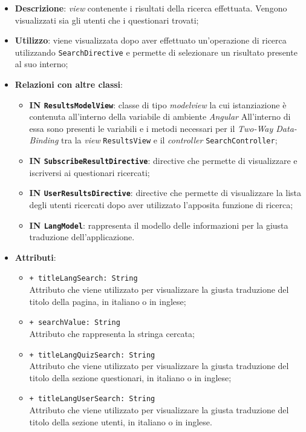 \begin{itemize}
	\item \textbf{Descrizione}: \textit{view} contenente i risultati della ricerca effettuata. Vengono visualizzati sia gli utenti che i questionari trovati;
	\item \textbf{Utilizzo}: viene visualizzata dopo aver effettuato un'operazione di ricerca utilizzando \texttt{SearchDirective} e permette di selezionare un risultato presente al suo interno; 
	\item \textbf{Relazioni con altre classi}:
	\begin{itemize}
		\item \textbf{IN \texttt{ResultsModelView}}: classe di tipo \textit{modelview} la cui istanziazione è contenuta all'interno della variabile di ambiente \textit{Angular} All'interno di essa sono presenti le variabili e i metodi necessari per il \textit{Two-Way Data-Binding} tra la \textit{view} \texttt{ResultsView} e il \textit{controller} \texttt{SearchController};
		\item \textbf{IN \texttt{SubscribeResultDirective}}: directive che permette di visualizzare e iscriversi ai questionari ricercati;
		\item \textbf{IN \texttt{UserResultsDirective}}: directive che permette di visualizzare la lista degli utenti ricercati dopo aver utilizzato l'apposita funzione di ricerca;
		\item \textbf{IN \texttt{LangModel}}: rappresenta il modello delle informazioni per la giusta traduzione dell'applicazione.
	\end{itemize}
	\item \textbf{Attributi}:
		\begin{itemize}
			\item \texttt{+ titleLangSearch: String} \\ Attributo che viene utilizzato per visualizzare la giusta traduzione del titolo della pagina, in italiano o in inglese;
			\item \texttt{+ searchValue: String} \\ Attributo che rappresenta la stringa cercata;
			\item \texttt{+ titleLangQuizSearch: String} \\ Attributo che viene utilizzato per visualizzare la giusta traduzione del titolo della sezione questionari, in italiano o in inglese;
			\item \texttt{+ titleLangUserSearch: String} \\ Attributo che viene utilizzato per visualizzare la giusta traduzione del titolo della sezione utenti, in italiano o in inglese.
		\end{itemize}
\end{itemize}